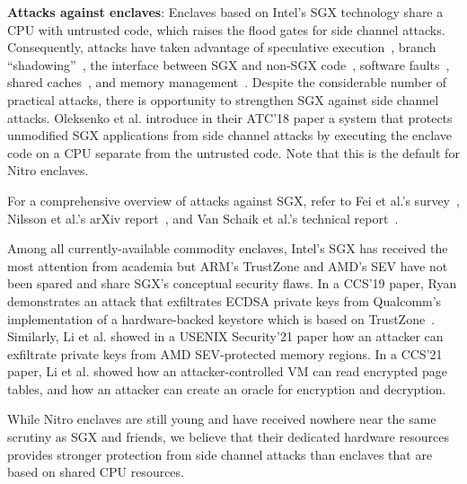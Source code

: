 \textbf{Attacks against enclaves}:
Enclaves based on Intel's SGX technology share a CPU with untrusted code, which
raises the flood gates for side channel attacks.  Consequently, attacks have
taken advantage of
speculative execution~\cite{VanBulck2018a,VanSchaik2021a},
branch ``shadowing''~\cite{Lee2017b},
the interface between SGX and non-SGX code~\cite{Bulck19a},
software faults~\cite{Murdock2020a},
shared caches~\cite{Brasser2017a},
and memory management~\cite{Wang2017a}.
Despite the considerable number of practical attacks, there is opportunity to
strengthen SGX against side channel attacks.  Oleksenko et al. introduce in
their ATC'18 paper a system that protects unmodified SGX applications from side
channel attacks by executing the enclave code on a CPU separate from the
untrusted code.  Note that this is the default for Nitro enclaves.

For a comprehensive overview of attacks against SGX, refer to Fei et al.'s
survey~\cite{Fei2021a}, Nilsson et al.'s arXiv report~\cite{Nilsson20a}, and
Van Schaik et al.'s technical report~\cite{Schaik2022a}.

Among all currently-available commodity enclaves, Intel's SGX has received the
most attention from academia but ARM's TrustZone and AMD's SEV have not been
spared and share SGX's conceptual security flaws.  In a CCS'19 paper, Ryan
demonstrates an attack that exfiltrates ECDSA private keys from Qualcomm's
implementation of a hardware-backed keystore which is based on
TrustZone~\cite{Ryan2019a}.  Similarly, Li et al. showed in a USENIX
Security'21 paper how an attacker can exfiltrate private keys from AMD
SEV-protected memory regions.  In a CCS'21 paper, Li et al. showed how an
attacker-controlled VM can read encrypted page tables, and how an attacker can
create an oracle for encryption and decryption.

While Nitro enclaves are still young and have received nowhere near the same
scrutiny as SGX and friends, we believe that their dedicated hardware resources
provides stronger protection from side channel attacks than enclaves
that are based on shared CPU resources.
